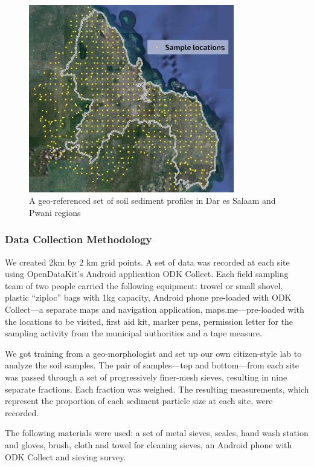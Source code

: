 \documentclass[a4paper,12pt,twoside]{article}
\begin{document}
\begin{figure}[h]
  \color{RHgreen}\caption{A geo-referenced set of soil sediment profiles in Dar es Salaam and Pwani regions}
  \centering
  \includegraphics[width=0.8\textwidth]{images/soil_sample_locations.jpg}
\end{figure}

\subsubsection{Data Collection Methodology}

\begin{multicols}{2}
We created 2km by 2 km grid points. A set of data was recorded at each site using OpenDataKit’s Android application ODK Collect. Each field sampling team of two people carried the following equipment: trowel or small shovel, plastic “ziploc” bags with 1kg capacity, Android phone pre-loaded with ODK Collect---a separate maps and navigation application, maps.me---pre-loaded with the locations to be visited, first aid kit, marker pens, permission letter for the sampling activity from the municipal authorities and a tape measure.

We got training from a geo-morphologist and set up our own citizen-style lab to analyze the soil samples. The pair of samples—top and bottom—from each site was passed through a set of progressively finer-mesh sieves, resulting in nine separate fractions. Each fraction was weighed. The resulting measurements, which represent the proportion of each sediment particle size at each site, were
recorded.

The following materials were used: a set of metal sieves, scales, hand wash station and gloves, brush, cloth and towel for cleaning sieves, an Android phone with ODK Collect and sieving survey.
\end{multicols}
\end{document}
